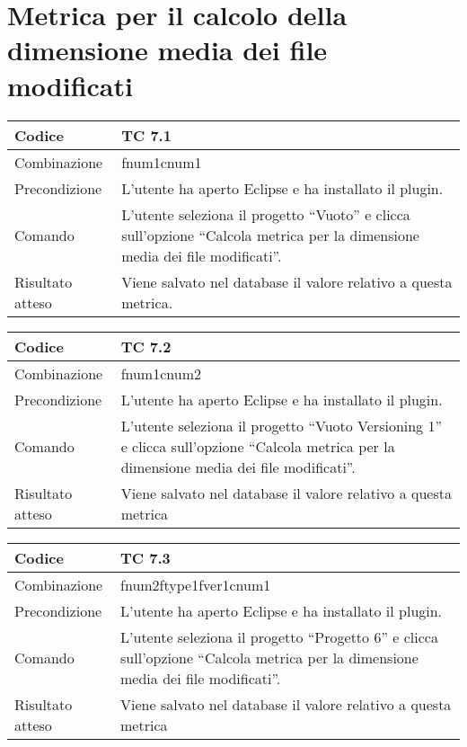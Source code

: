 \clearpage

\section{Metrica per il calcolo della dimensione media dei file modificati}

\begin{table}[ht]
\begin{tabular}{|p{3cm}|p{9cm}|}
\hline
\cellcolor{lightgray}Codice				& TC 7.1								\\
\hline
\cellcolor{lightgray}Combinazione		& fnum1cnum1									\\
\hline
\cellcolor{lightgray}Precondizione		& L'utente ha aperto Eclipse e ha installato il plugin.		\\
\hline
\cellcolor{lightgray}Comando			& L'utente seleziona il progetto ``Vuoto''  e clicca sull'opzione ``Calcola metrica per la dimensione media dei file modificati''.	\\
\hline
\cellcolor{lightgray}Risultato atteso	& Viene salvato nel database il valore relativo a questa metrica.\\
\hline
\end{tabular}
\end{table}

\begin{table}[ht]
\begin{tabular}{|p{3cm}|p{9cm}|}
\hline
\cellcolor{lightgray}Codice				& TC 7.2								\\
\hline
\cellcolor{lightgray}Combinazione		& fnum1cnum2 									\\
\hline
\cellcolor{lightgray}Precondizione		& L'utente ha aperto Eclipse e ha installato il plugin.				\\
\hline
\cellcolor{lightgray}Comando			& L'utente seleziona il progetto ``Vuoto Versioning 1''  e clicca sull'opzione ``Calcola metrica per la dimensione media dei file modificati''.	\\
\hline
\cellcolor{lightgray}Risultato atteso	& Viene salvato nel database il valore relativo a questa metrica	\\
\hline
\end{tabular}
\end{table}

\begin{table}[ht]
\begin{tabular}{|p{3cm}|p{9cm}|}
\hline
\cellcolor{lightgray}Codice				& TC 7.3								\\
\hline
\cellcolor{lightgray}Combinazione		& fnum2ftype1fver1cnum1								\\
\hline
\cellcolor{lightgray}Precondizione		& L'utente ha aperto Eclipse e ha installato il plugin.					\\
\hline
\cellcolor{lightgray}Comando			& L'utente seleziona il progetto ``Progetto 6''  e clicca sull'opzione ``Calcola metrica per la dimensione media dei file modificati''.	\\
\hline
\cellcolor{lightgray}Risultato atteso	& Viene salvato nel database il valore relativo a questa metrica	\\
\hline
\end{tabular}
\end{table}

